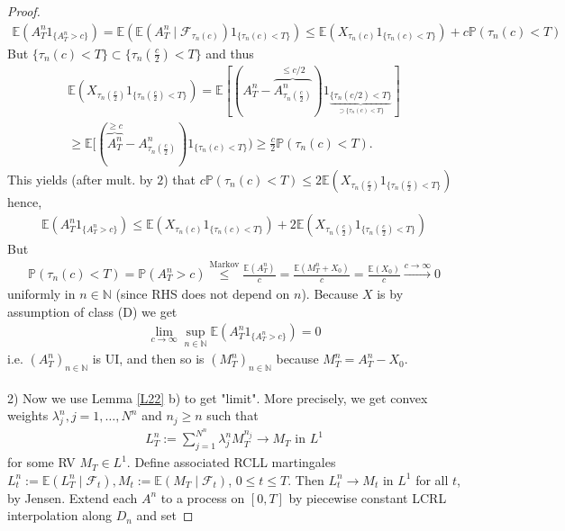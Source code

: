\documentclass[12pt,a4paper, twoside]{article}
\theoremstyle{definition}
\newcommand{\EE}{\mathbb{E}} %
\newcommand{\PP}{\mathbb{P}} %
\begin{document}
\begin{proof}
\begin{align*}
\EE(A_T^n 1_{\{A_T^n > c\}}) = \EE(\EE(A_T^n \mid \mathcal{F}_{\tau_n(c)}) 1_{\{ \tau_n(c) <T\}}) \leq \EE( X_{\tau_n(c)} 1_{\{ \tau_n(c) < T\}}) + c \PP( \tau_n(c) < T)
\end{align*}
But $\{\tau_n(c) < T\} \subset \{ \tau_n ( \frac{c}{2}) < T\}$ and thus 
\begin{align*}
\EE( X_{\tau_n( \frac{c}{2})} 1_{\{ \tau_n ( \frac{c}{2}) < T \}}) =  \EE[( A_T^n -\overbrace{A_{ \tau_n( \frac{c}{2})}^n}^{ \leq c/2}) 1_{\underbrace{\{ \tau_n (c/2) < T\}}_{ \supset \{ \tau_n(c) < T\}}}] \\
\geq \EE[( \overbrace{A_T^n}^{ \geq c} - A_{\tau_n( \frac{c}{2})}^n) 1_{\{ \tau_n(c) < T\}}) \geq \frac{c}{2} \PP( \tau_n(c) < T).
\end{align*}
This yields (after mult. by $2$) that $c\PP( \tau_n(c) < T) \leq 2 \EE( X_{\tau_n( \frac{c}{2})} 1_{\{ \tau_n ( \frac{c}{2}) < T \}})$ hence,
\begin{align*}
\EE( A_T^n 1_{\{A_T^n >c\}}) \leq \EE( X_{\tau_n(c)} 1_{\{ \tau_n(c) < T\}}) + 2 \EE(X_{\tau_n( \frac{c}{2})} 1_{\{ \tau_n ( \frac{c}{2}) < T\}}) \tag{*}
\end{align*}
But
\begin{align*}
\PP( \tau_n(c) < T) = \PP(A_T^n >c) \overset{\text{Markov}}\leq \frac{\EE(A_T^n)}{c} = \frac{\EE(M_T^n + X_0)}{c} = \frac{\EE(X_0)}{c} \xrightarrow{c \to \infty} 0
\end{align*}
uniformly in $n \in \mathbb{N}$ (since RHS does not depend on $n$). Because $X$ is by assumption of class (D) we get 
\begin{align*}
\lim_{c \to \infty} \sup_{n \in \mathbb{N}} \EE( A_T^n 1_{\{ A_T^n > c\}}) = 0
\end{align*}
i.e. $(A_T^n)_{n \in \mathbb{N}}$ is UI, and then so is $(M_T^n)_{n \in \mathbb{N}}$ because $M_T^n = A_T^n -X_0$. 
\\\\
2) Now we use Lemma \ref{L22} b) to get "limit". More precisely, we get convex weights $\lambda_j^n, j=1, \dots , N^n$ and $n_j \geq n$ such that 
\begin{align*}
L_T^n := \sum_{j=1}^{N^n} \lambda_j^n M_T^{n_j} \to M_T \text{ in } L^1
\end{align*}
for some RV $M_T \in L^1$. Define associated RCLL martingales $L_t^n := \EE(L_T^n \mid \mathcal{F}_t), M_t:= \EE( M_T \mid \mathcal{F}_t)$, $0 \leq t \leq T$. Then $L_t^n \to M_t$ in $L^1$ for all $t$, by Jensen. Extend each $A^n$ to a process on $[0,T]$ by piecewise constant LCRL interpolation along $D_n$ and set 

\end{proof}
\end{document}
